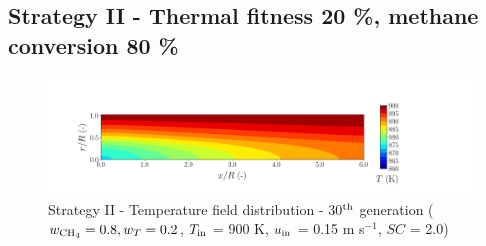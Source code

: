 \documentclass[preprint,12pt]{elsarticle}
\begin{document}

\clearpage


\subsection{Strategy II - Thermal fitness 20 \%, methane conversion 80 \%} 
\label{subsec:S28020}

%

\begin{figure}[h!]
\centering
\includegraphics[width=150mm]{results/5Eq/80C_20T/GEN30-TFIELD.png}
\caption{\label{fig:5RES8020G30-TField} Strategy II - Temperature field distribution - 30$^{\rm{th}}$ generation ($w_{\rm{CH_4}} = 0.8, w_T = 0.2$, $T_{\rm{in}}$ = 900 K, $u_{\rm{in}}$ = 0.15 m s$^{-1}$, $SC$ = 2.0)}
\end{figure}

%
\end{document}
